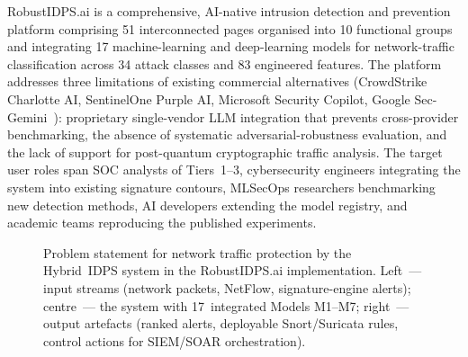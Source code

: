 \textsf{RobustIDPS.ai} is a comprehensive, AI-native intrusion
detection and prevention platform comprising 51 interconnected
pages organised into 10 functional groups and integrating 17
machine-learning and deep-learning models for network-traffic
classification across 34 attack classes and 83 engineered
features. The platform addresses three limitations of existing
commercial alternatives (CrowdStrike Charlotte AI, SentinelOne
Purple AI, Microsoft Security Copilot, Google
Sec-Gemini~\cite{Smith2023}): proprietary single-vendor LLM
integration that prevents cross-provider benchmarking, the
absence of systematic adversarial-robustness evaluation, and the
lack of support for post-quantum cryptographic traffic analysis.
The target user roles span SOC analysts of Tiers~1--3,
cybersecurity engineers integrating the system into existing
signature contours, MLSecOps researchers benchmarking new
detection methods, AI developers extending the model registry,
and academic teams reproducing the published experiments.

\begin{figure}[htbp]
\centering
{}
\caption{Problem statement for network traffic protection by the
Hybrid~IDPS system in the \textsf{RobustIDPS.ai} implementation.
Left~--- input streams (network packets, NetFlow, signature-engine
alerts); centre~--- the system with 17~integrated Models M1--M7;
right~--- output artefacts (ranked alerts, deployable
Snort/Suricata rules, control actions for SIEM/SOAR orchestration).}
\label{fig:platform_problem_box}
\end{figure}

